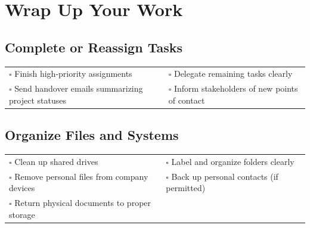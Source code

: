
\section{Wrap Up Your Work}
\label{sec:work}

\subsection{Complete or Reassign Tasks}

\begin{tabular}{p{9cm} p{8cm}}
$\square$ Finish high-priority assignments & $\square$ Delegate remaining tasks clearly \\ 
$\square$ Send handover emails summarizing project statuses & $\square$ Inform stakeholders of new points of contact \\ 
\end{tabular}

\subsection{Organize Files and Systems}

\begin{tabular}{p{9cm} p{8cm}}
$\square$ Clean up shared drives & $\square$ Label and organize folders clearly \\ 
$\square$ Remove personal files from company devices & $\square$ Back up personal contacts (if permitted) \\ 
$\square$ Return physical documents to proper storage & \\ 
\end{tabular}


